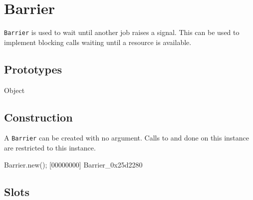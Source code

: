 
\section{Barrier}

\lstinline|Barrier| is used to wait until another job raises a signal.
This can be used to implement blocking calls waiting until a resource
is available.

\subsection{Prototypes}

\begin{refObjects}
\item[Object]
\end{refObjects}

\subsection{Construction}

A \lstinline|Barrier| can be created with no argument.  Calls to
 and  done on this instance are restricted to
this instance.

\begin{urbiscript}[firstnumber=1]
Barrier.new();
[00000000] Barrier_0x25d2280
\end{urbiscript}

\subsection{Slots}


